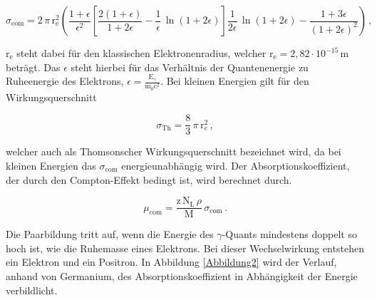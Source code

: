\begin{equation}
    \sigma_{\text{com}} = 2\,\pi\,\text{r}_{\text{e}}^{2} \left(  \frac{1 + \epsilon}{\epsilon^{2}} \left[ \frac{2(1+\epsilon)}{1+2\epsilon} - \frac{1}{\epsilon}\,\ln(1+2\epsilon) \right]  \frac{1}{2\epsilon}\,\ln(1+2\epsilon)  -\frac{1+3\epsilon}{(1+2\epsilon)^{2}}        \right) \,,\label{5}
\end{equation}

\begin{flushleft}
    $\text{r}_{\text{e}}$ steht dabei für den klassischen Elektronenradius, welcher $\text{r}_{\text{e}} = 2,82 \cdot 10^{-15}\,\unit{\meter}$ beträgt.
    Das $\epsilon$ steht hierbei für das Verhältnis der Quantenenergie zu Ruheenergie des Elektrons, $\epsilon = \frac{\text{E}_{\gamma}}{\text{m}_{0} \text{c}^2}$.
    Bei kleinen Energien gilt für den Wirkungsquerschnitt
\end{flushleft}

\begin{equation}
    \sigma_{\text{Th}} = \frac{8}{3}\,\pi\,\text{r}_{e}^2\,,  \label{6}
\end{equation}

\begin{flushleft}
    welcher auch als Thomsonscher Wirkungsquerschnitt bezeichnet wird, da bei kleinen Energien das $\sigma_{\text{com}}$ energieunabhängig wird.
    Der Absorptionskoeffizient, der durch den Compton-Effekt bedingt ist, wird berechnet durch.
\end{flushleft}

\begin{equation}
    \mu_{\text{com}} = \frac{\text{z}\,\text{N}_{\text{L}}\,\rho}{\text{M}}\,\sigma_{\text{com}}\,. \label{7}
\end{equation}

\begin{flushleft}
    Die Paarbildung tritt auf, wenn die Energie des $\gamma$-Quants mindestens doppelt so hoch ist, wie die Ruhemasse eines Elektrons.
    Bei dieser Wechselwirkung entstehen ein Elektron und ein Positron.
    In Abbildung \ref{Abbildung2} wird der Verlauf, anhand von Germanium, des Absorptionskoeffizient in Abhängigkeit der Energie verbildlicht. 
\end{flushleft}

